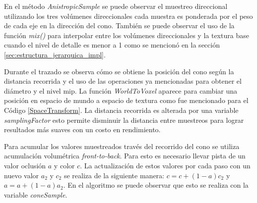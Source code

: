 En el método \emph{AnistropicSample} se puede observar el muestreo direccional utilizando los tres volúmenes direccionales cada muestra es ponderada por el peso de cada eje en la dirección del cono. También se puede observar el uso de la función \emph{mix()} para interpolar entre los volúmenes direccionales y la textura base cuando el nivel de detalle es menor a 1 como se mencionó en la sección \ref{sec:estructura_jerarquica_impl}.

Durante el trazado se observa cómo se obtiene la posición del cono según la distancia recorrida y el uso de las operaciones ya mencionadas para obtener el diámetro y el nivel mip. La función \emph{WorldToVoxel} aparece para cambiar una posición en espacio de mundo a espacio de textura como fue mencionado para el Código \ref{SpaceTransform}. La distancia recorrida es alterada por una variable \emph{samplingFactor} esto permite disminuir la distancia entre muestreos para lograr resultados más suaves con un costo en rendimiento.

Para acumular los valores muestreados través del recorrido del cono se utiliza acumulación volumétrica \emph{front-to-back}. Para esto es necesario llevar pista de un valor oclusión $a$ y color $c$. La actualización de estos valores por cada paso con un nuevo valor $a_2$ y $c_2$ se realiza de la siguiente manera: $c=c+(1-a)c_2$ y $a=a+(1-a)a_2$. En el algoritmo se puede observar que esto se realiza con la variable \emph{coneSample}.

